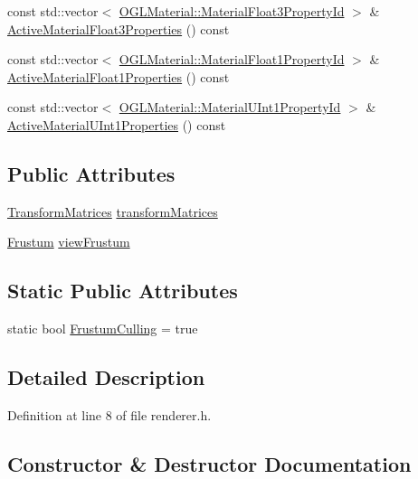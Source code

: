 \begin{DoxyCompactItemize}
\item 
const std\+::vector$<$ \hyperlink{class_o_g_l_material_a1fc530fc808e270be78c8b296abed0ce}{O\+G\+L\+Material\+::\+Material\+Float3\+Property\+Id} $>$ \& \hyperlink{class_renderer_a500def6bb40cc675378c4ec45efe9134}{Active\+Material\+Float3\+Properties} () const 
\item 
const std\+::vector$<$ \hyperlink{class_o_g_l_material_a27506550fa395365703eb941e525e64c}{O\+G\+L\+Material\+::\+Material\+Float1\+Property\+Id} $>$ \& \hyperlink{class_renderer_ac95684182e0a42b85e2634e62999480c}{Active\+Material\+Float1\+Properties} () const 
\item 
const std\+::vector$<$ \hyperlink{class_o_g_l_material_a79448ba294d1923d56ebca495b0c272e}{O\+G\+L\+Material\+::\+Material\+U\+Int1\+Property\+Id} $>$ \& \hyperlink{class_renderer_ae14a7f1ca18400cffb13b65eba0c81e7}{Active\+Material\+U\+Int1\+Properties} () const 
\end{DoxyCompactItemize}
\subsection*{Public Attributes}
\begin{DoxyCompactItemize}
\item 
\hyperlink{class_transform_matrices}{Transform\+Matrices} \hyperlink{class_renderer_ad4ce90a115478964bef92667f131870f}{transform\+Matrices}
\item 
\hyperlink{class_frustum}{Frustum} \hyperlink{class_renderer_a5f730b80cb0e6894bc7205b7eef91999}{view\+Frustum}
\end{DoxyCompactItemize}
\subsection*{Static Public Attributes}
\begin{DoxyCompactItemize}
\item 
static bool \hyperlink{class_renderer_aa4db44c64586903d1f5a14d3dfbdd47b}{Frustum\+Culling} = true
\end{DoxyCompactItemize}


\subsection{Detailed Description}


Definition at line 8 of file renderer.\+h.



\subsection{Constructor \& Destructor Documentation}
\hypertarget{class_renderer_abb257d89f41b81edc620c813b08738be}{}
